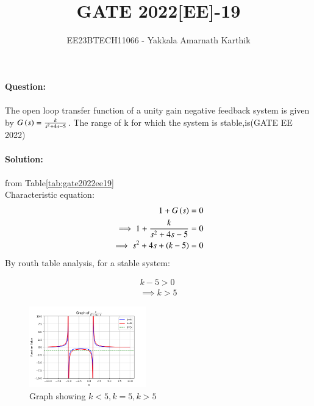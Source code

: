 \documentclass[journal,12pt,twocolumn]{IEEEtran}
\begin{document}


\title{GATE 2022[EE]-19}
\author{EE23BTECH11066 - Yakkala Amarnath Karthik}
\maketitle


\textbf{Question:}\\ \\
The open loop transfer function of a unity gain negative feedback system is given by $G\left(s\right)= \frac{k}{s^2 +4s-5}$. The range of k for which the system is stable,is\hfill(GATE EE 2022)\\ \\

\textbf{Solution:}\\ 
\\
 from Table\ref{tab:gate2022ee19}\\
Characteristic equation:
\begin{align}
    1+G\left(s\right)=0\\
    \implies 1+\frac{k}{s^2 +4s-5}=0\\
    \implies s^2+4s+\left(k-5\right)=0
\end{align}
By routh table analysis, for a stable system:


\begin{align}
    k-5>0\\
    \implies k>5
\end{align}

\begin{figure}[ht]
    \centering
    \includegraphics[width=0.45\textwidth]{figs/gate2022.png}
    \caption{Graph showing $k<5,k=5,k>5$}
\end{figure}
\end{document}
